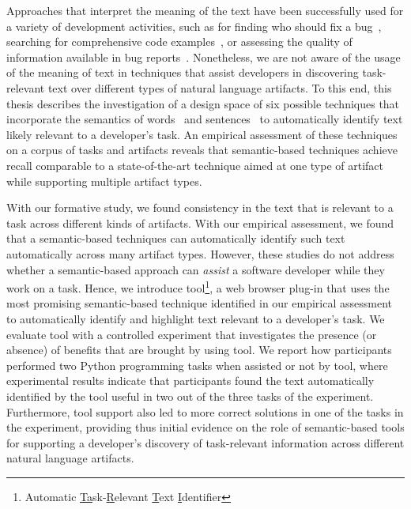Approaches that interpret the meaning of the text have been successfully used for a variety of development activities,
such as for finding who should fix a bug~\cite{yang2016}, searching for comprehensive code examples~\cite{silva2019}, or assessing the quality of information available in bug reports~\cite{chaparro2019}.
Nonetheless, we are not aware of the usage of the meaning of text in techniques 
that assist developers in discovering task-relevant text over different types of natural language artifacts.
To this end, this thesis describes the investigation of a design space
of six possible techniques that incorporate the semantics of words~\cite{Mikolov2013, Devlin2018Bert}
and sentences~\cite{fillmore1976frame, marques2021}
to automatically identify text likely relevant to a developer's task.
An empirical assessment of these techniques 
on a corpus of tasks
and artifacts reveals that semantic-based techniques
achieve recall comparable to a state-of-the-art technique aimed at one type of artifact~\cite{Xu2017}
while supporting
multiple artifact types.






With our formative study, we found consistency in the text  that is relevant to a task across different kinds of artifacts.
With our empirical assessment, we found that a semantic-based techniques can automatically identify such text
automatically across many artifact types.
However, these studies do not address whether a semantic-based approach can \textit{assist} a software developer while they work on a task.
Hence, we introduce \acs{tool}\footnote{
    Automatic \underline{Ta}sk-\underline{R}elevant \underline{T}ext \underline{I}dentifier
}, a web browser plug-in that 
uses the most promising semantic-based technique identified in our empirical assessment
to automatically identify and highlight text relevant to a developer's task.
We evaluate \acs{tool} with a controlled experiment that investigates the presence (or absence) of benefits that are brought by using \acs{tool}.
We report how  participants 
performed two Python programming tasks when 
 assisted or not by \acs{tool},
where experimental results indicate that participants found the text automatically identified
by the tool 
useful in two out of the three tasks of the experiment.
Furthermore, tool support also led to more correct solutions 
in one of the tasks in the experiment, providing thus
initial evidence on the role of semantic-based tools 
for supporting a developer's discovery of task-relevant information
across different natural language artifacts.
